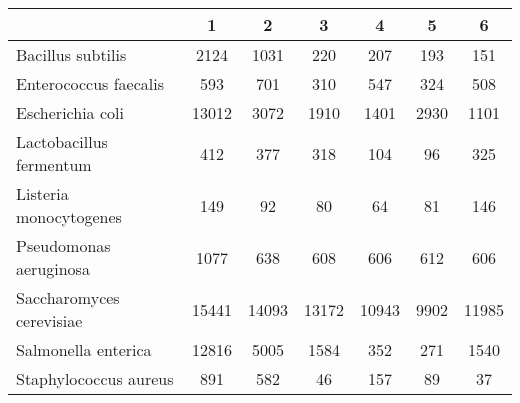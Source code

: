 \begin{adjustbox}{center}
\begin{tabular}{|l||c|c|c|c|c|c|}
\hline
& 1 & 2 & 3 & 4 & 5 & 6 \\
\hline
\hline
Bacillus subtilis & \cellcolor[RGB]{235, 71, 71} 2124 & \cellcolor[RGB]{235, 71, 71} 1031 & \cellcolor[RGB]{253, 241, 241} 220 & \cellcolor[RGB]{246, 246, 254} 207 & \cellcolor[RGB]{223, 223, 251} 193 & \cellcolor[RGB]{94, 94, 237} 151 \\
\hline
Enterococcus faecalis & \cellcolor[RGB]{253, 237, 237} 593 & \cellcolor[RGB]{250, 209, 209} 701 & \cellcolor[RGB]{218, 218, 251} 310 & \cellcolor[RGB]{254, 250, 250} 547 & \cellcolor[RGB]{218, 218, 251} 324 & \cellcolor[RGB]{250, 250, 254} 508 \\
\hline
Escherichia coli & \cellcolor[RGB]{235, 71, 71} 13012 & \cellcolor[RGB]{252, 232, 232} 3072 & \cellcolor[RGB]{241, 241, 253} 1910 & \cellcolor[RGB]{227, 227, 252} 1401 & \cellcolor[RGB]{253, 237, 237} 2930 & \cellcolor[RGB]{218, 218, 251} 1101 \\
\hline
Lactobacillus fermentum & \cellcolor[RGB]{252, 232, 232} 412 & \cellcolor[RGB]{253, 241, 241} 377 & \cellcolor[RGB]{255, 255, 255} 318 & \cellcolor[RGB]{218, 218, 251} 104 & \cellcolor[RGB]{218, 218, 251} 96 & \cellcolor[RGB]{255, 255, 255} 325 \\
\hline
Listeria monocytogenes & \cellcolor[RGB]{235, 71, 71} 149 & \cellcolor[RGB]{252, 232, 232} 92 & \cellcolor[RGB]{232, 232, 252} 80 & \cellcolor[RGB]{172, 172, 246} 64 & \cellcolor[RGB]{237, 237, 253} 81 & \cellcolor[RGB]{235, 71, 71} 146 \\
\hline
Pseudomonas aeruginosa & \cellcolor[RGB]{235, 71, 71} 1077 & \cellcolor[RGB]{235, 71, 71} 638 & \cellcolor[RGB]{241, 241, 253} 608 & \cellcolor[RGB]{227, 227, 252} 606 & \cellcolor[RGB]{253, 237, 237} 612 & \cellcolor[RGB]{227, 227, 252} 606 \\
\hline
Saccharomyces cerevisiae & \cellcolor[RGB]{247, 186, 186} 15441 & \cellcolor[RGB]{251, 218, 218} 14093 & \cellcolor[RGB]{253, 241, 241} 13172 & \cellcolor[RGB]{223, 223, 251} 10943 & \cellcolor[RGB]{205, 205, 249} 9902 & \cellcolor[RGB]{246, 246, 254} 11985 \\
\hline
Salmonella enterica & \cellcolor[RGB]{235, 71, 71} 12816 & \cellcolor[RGB]{235, 71, 71} 5005 & \cellcolor[RGB]{255, 255, 255} 1584 & \cellcolor[RGB]{218, 218, 251} 352 & \cellcolor[RGB]{218, 218, 251} 271 & \cellcolor[RGB]{255, 255, 255} 1540 \\
\hline
Staphylococcus aureus & \cellcolor[RGB]{235, 71, 71} 891 & \cellcolor[RGB]{235, 71, 71} 582 & \cellcolor[RGB]{227, 227, 252} 46 & \cellcolor[RGB]{253, 241, 241} 157 & \cellcolor[RGB]{241, 241, 253} 89 & \cellcolor[RGB]{223, 223, 251} 37 \\
\hline
\end{tabular}
\end{adjustbox}
